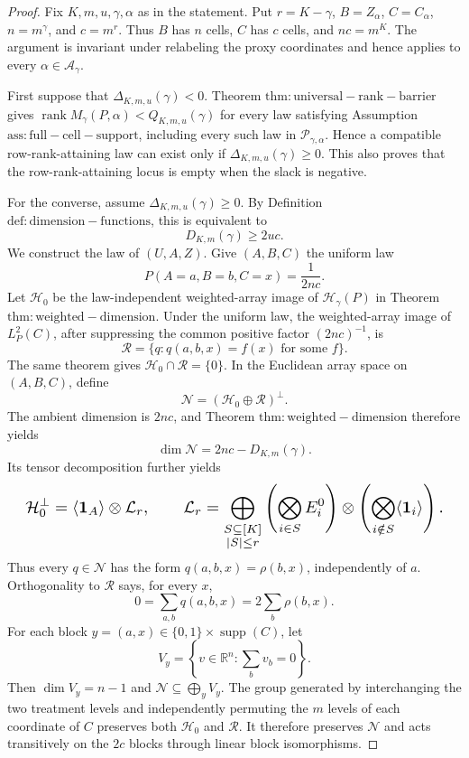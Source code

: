 \documentclass{article}
\begin{document}
\begin{proof}
Fix \(K,m,u,\gamma,\alpha\) as in the statement. Put \(r=K-\gamma\), \(B=Z_\alpha\), \(C=C_\alpha\), \(n=m^\gamma\), and \(c=m^r\). Thus \(B\) has \(n\) cells, \(C\) has \(c\) cells, and \(nc=m^K\). The argument is invariant under relabeling the proxy coordinates and hence applies to every \(\alpha\in\mathcal A_\gamma\).

First suppose that \(\Delta_{K,m,u}(\gamma)<0\). Theorem \(\mathrm{thm:universal-rank-barrier}\) gives \(\operatorname{rank}M_\gamma(P,\alpha)<Q_{K,m,u}(\gamma)\) for every law satisfying Assumption \(\mathrm{ass:full-cell-support}\), including every such law in \(\mathcal P_{\gamma,\alpha}\). Hence a compatible row-rank-attaining law can exist only if \(\Delta_{K,m,u}(\gamma)\ge0\). This also proves that the row-rank-attaining locus is empty when the slack is negative.

For the converse, assume \(\Delta_{K,m,u}(\gamma)\ge0\). By Definition \(\mathrm{def:dimension-functions}\), this is equivalent to
\[D_{K,m}(\gamma)\ge 2uc.\]
We construct the law of \((U,A,Z)\). Give \((A,B,C)\) the uniform law
\[P(A=a,B=b,C=x)=\frac{1}{2nc}.\]
Let \(\mathcal H_0\) be the law-independent weighted-array image of \(\mathcal H_\gamma(P)\) in Theorem \(\mathrm{thm:weighted-dimension}\). Under the uniform law, the weighted-array image of \(L_P^2(C)\), after suppressing the common positive factor \((2nc)^{-1}\), is
\[\mathcal R=\{q:q(a,b,x)=f(x)\text{ for some }f\}.\]
The same theorem gives \(\mathcal H_0\cap\mathcal R=\{0\}\). In the Euclidean array space on \((A,B,C)\), define
\[\mathcal N=(\mathcal H_0\oplus\mathcal R)^\perp.\]
The ambient dimension is \(2nc\), and Theorem \(\mathrm{thm:weighted-dimension}\) therefore yields
\[\dim\mathcal N=2nc-D_{K,m}(\gamma).\]
Its tensor decomposition further yields
\[
\makebox[\linewidth][c]{\resizebox{0.98\linewidth}{!}{\par\noindent \makebox[\linewidth][c]{\resizebox{0.98\linewidth}{!}{\(\displaystyle \displaystyle \mathcal H_0^\perp=\langle\mathbf1_A\rangle\otimes\mathcal L_r,\qquad \mathcal L_r=\bigoplus_{\substack{S\subseteq[K]\\|S|\le r}}\left(\bigotimes_{i\in S}E_i^0\right)\otimes\left(\bigotimes_{i\notin S}\langle\mathbf1_i\rangle\right).\)}}\par\noindent}}
\]
Thus every \(q\in\mathcal N\) has the form \(q(a,b,x)=\rho(b,x)\), independently of \(a\). Orthogonality to \(\mathcal R\) says, for every \(x\),
\[0=\sum_{a,b}q(a,b,x)=2\sum_b\rho(b,x).\]
For each block \(y=(a,x)\in\{0,1\}\times\operatorname{supp}(C)\), let
\[V_y=\left\{v\in\mathbb R^n:\sum_bv_b=0\right\}.\]
Then \(\dim V_y=n-1\) and \(\mathcal N\subseteq\bigoplus_yV_y\). The group generated by interchanging the two treatment levels and independently permuting the \(m\) levels of each coordinate of \(C\) preserves both \(\mathcal H_0\) and \(\mathcal R\). It therefore preserves \(\mathcal N\) and acts transitively on the \(2c\) blocks through linear block isomorphisms.


\end{proof}
\end{document}
